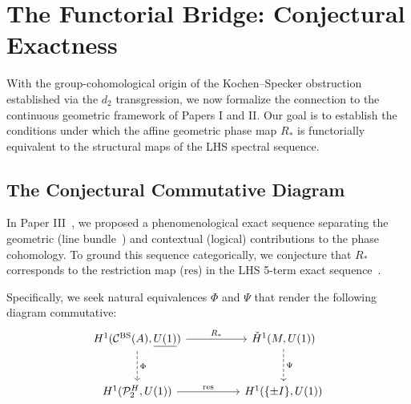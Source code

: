 \documentclass[11pt]{article}
\begin{document}
\section{The Functorial Bridge: Conjectural Exactness}
\label{sec:functorial}

With the group-cohomological origin of the Kochen--Specker obstruction established via the $d_2$ transgression, we now formalize the connection to the continuous geometric framework of Papers I and II. Our goal is to establish the conditions under which the affine geometric phase map $R_*$ is functorially equivalent to the structural maps of the LHS spectral sequence.

\subsection{The Conjectural Commutative Diagram}

In Paper III~\cite{PaperIII}, we proposed a phenomenological exact sequence separating the geometric (line bundle~\cite{PaperI,PaperII}) and contextual (logical) contributions to the phase cohomology. To ground this sequence categorically, we conjecture that $R_*$ corresponds to the restriction map ($\mathrm{res}$) in the LHS 5-term exact sequence~\cite{HS53,Brown82}.

Specifically, we seek natural equivalences $\Phi$ and $\Psi$ that render the following diagram commutative:
\[
\begin{tikzcd}[row sep=large, column sep=huge]
  H^1(\mathcal{C}^{\mathrm{BS}}(A), \underline{U(1)}) \arrow[r, "R_*"] \arrow[d, dashed, "\Phi"] & \check{H}^1(M, U(1)) \arrow[d, dashed, "\Psi"] \\
  H^1(\mathcal{P}_2^H, U(1)) \arrow[r, "\mathrm{res}"] & H^1(\{\pm I\}, U(1))
\end{tikzcd}
\]
\end{document}

